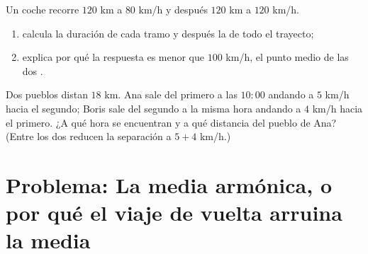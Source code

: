 \begin{exercise}[$\star\star$]\label{exo:g8:speed:10}
Un coche recorre $120$ km a $80$ km/h y después $120$ km a $120$ km/h.
\begin{enumerate}
  \item calcula la duración de cada tramo y después la  de
        todo el trayecto;
  \item explica por qué la respuesta es menor que $100$ km/h, el punto medio
        de las dos .
\end{enumerate}
\end{exercise}

\begin{exercise}[$\star\star\star$]\label{exo:g8:speed:11}
Dos pueblos distan $18$ km. Ana sale del primero a las $10{:}00$
andando a $5$ km/h hacia el segundo; Boris sale del segundo a
la misma hora andando a $4$ km/h hacia el primero. ¿A qué hora se
encuentran y a qué distancia del pueblo de Ana? (Entre los dos
reducen la separación a $5 + 4$ km/h.)
\end{exercise}

\section{Problema: La media armónica, o por qué el viaje de vuelta arruina
la media}

